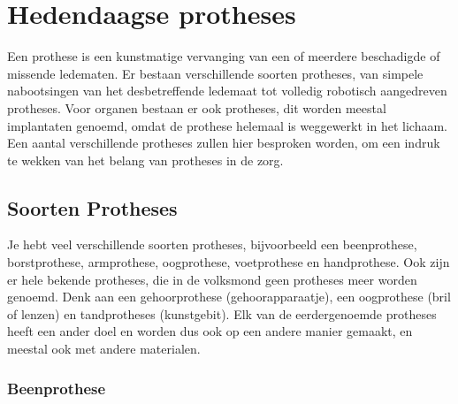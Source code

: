 \hypertarget{hedendaagse-protheses}{%
\section{Hedendaagse protheses}\label{hedendaagse-protheses}}

Een prothese is een kunstmatige vervanging van een of meerdere
beschadigde of missende ledematen. Er bestaan verschillende soorten
protheses, van simpele nabootsingen van het desbetreffende ledemaat tot
volledig robotisch aangedreven protheses. Voor organen bestaan er ook
protheses, dit worden meestal implantaten genoemd, omdat de prothese
helemaal is weggewerkt in het lichaam. Een aantal verschillende
protheses zullen hier besproken worden, om een indruk te wekken van het
belang van protheses in de zorg.

\hypertarget{soorten-protheses}{%
\subsection{Soorten Protheses}\label{soorten-protheses}}

Je hebt veel verschillende soorten protheses, bijvoorbeeld een
beenprothese, borstprothese, armprothese, oogprothese, voetprothese en
handprothese. Ook zijn er hele bekende protheses, die in de volksmond
geen protheses meer worden genoemd. Denk aan een gehoorprothese
(gehoorapparaatje), een oogprothese (bril of lenzen) en tandprotheses
(kunstgebit). Elk van de eerdergenoemde protheses heeft een ander doel
en worden dus ook op een andere manier gemaakt, en meestal ook met
andere materialen.

\hypertarget{beenprothese}{%
\subsubsection*{Beenprothese}\label{beenprothese}}

